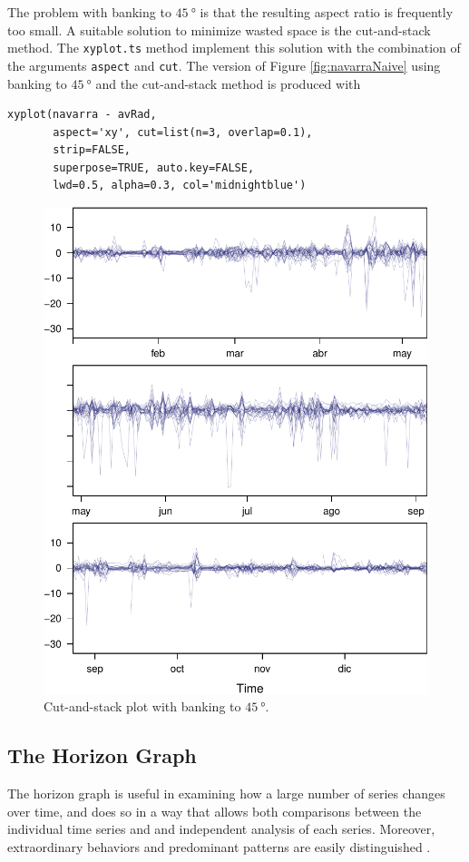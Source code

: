 The problem with banking to $\SI{45}{\degree}$ is that the resulting
aspect ratio is frequently too small. A suitable solution to
minimize wasted space is the cut-and-stack method. The \texttt{xyplot.ts}
method implement this solution with the combination of the
arguments \texttt{aspect} and \texttt{cut}. The version of Figure
\ref{fig:navarraNaive} using banking to $\SI{45}{\degree}$ and the
cut-and-stack method is produced with
\lstset{language=R,numbers=none}
\begin{lstlisting}
xyplot(navarra - avRad,
       aspect='xy', cut=list(n=3, overlap=0.1),
       strip=FALSE,
       superpose=TRUE, auto.key=FALSE,
       lwd=0.5, alpha=0.3, col='midnightblue')
\end{lstlisting}

\begin{figure}[htb]
\centering
\includegraphics[width=.9\linewidth]{figs/navarraBanking.pdf}
\caption{\label{fig:navarraBanking}Cut-and-stack plot with banking to $\SI{45}{\degree}$.}
\end{figure}
\subsection{The Horizon Graph}
\label{sec-2-2}
The horizon graph is useful in examining how a
large number of series changes over time, and does so in a way
that allows both comparisons between the individual time series
and and independent analysis of each series. Moreover,
extraordinary behaviors and predominant patterns are easily
distinguished \cite{Heer.Kong.ea2009, Few2008}.

